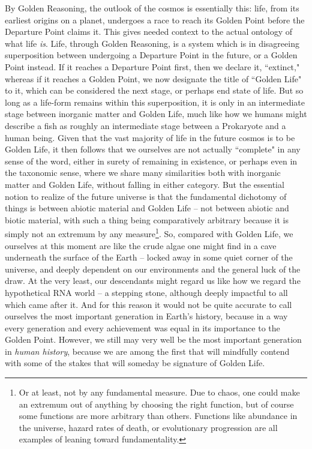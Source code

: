 By Golden Reasoning, the outlook of the cosmos is essentially this: life, from its earliest origins on a planet, undergoes a race to reach its Golden Point before the Departure Point claims it. This gives needed context to the actual ontology of what life \textit{is}. Life, through Golden Reasoning, is a system which is in disagreeing superposition between undergoing a Departure Point in the future, or a Golden Point instead. If it reaches a Departure Point first, then we declare it, ``extinct," whereas if it reaches a Golden Point, we now designate the title of ``Golden Life" to it, which can be considered the next stage, or perhaps end state of life. But so long as a life-form remains within this superposition, it is only in an intermediate stage between inorganic matter and Golden Life, much like how we humans might describe a fish as roughly an intermediate stage between a Prokaryote and a human being. Given that the vast majority of life in the future cosmos is to be Golden Life, it then follows that we ourselves are not actually ``complete" in any sense of the word, either in surety of remaining in existence, or perhaps even in the taxonomic sense, where we share many similarities both with inorganic matter and Golden Life, without falling in either category. But the essential notion to realize of the future universe is that the fundamental dichotomy of things is between abiotic material and Golden Life -- not between abiotic and biotic material, with such a thing being comparatively arbitrary because it is simply not an extremum by any measure\footnote{Or at least, not by any fundamental measure. Due to chaos, one could make an extremum out of anything by choosing the right function, but of course some functions are more arbitrary than others. Functions like abundance in the universe, hazard rates of death, or evolutionary progression are all examples of leaning toward fundamentality.}. So, compared with Golden Life, we ourselves at this moment are like the crude algae one might find in a cave underneath the surface of the Earth -- locked away in some quiet corner of the universe, and deeply dependent on our environments and the general luck of the draw. At the very least, our descendants might regard us like how we regard the hypothetical RNA world \cite{} -- a stepping stone, although deeply impactful to all which came after it. And for this reason it would not be quite accurate to call ourselves the most important generation in Earth's history, because in a way every generation and every achievement was equal in its importance to the Golden Point. However, we still may very well be the most important generation in \textit{human history}, because we are among the first that will mindfully contend with some of the stakes that will someday be signature of Golden Life. 

